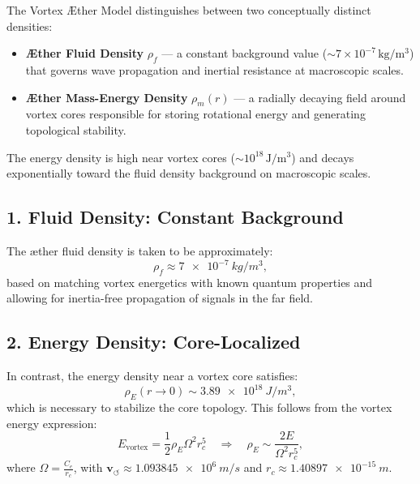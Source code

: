 The Vortex Æther Model distinguishes between two conceptually distinct densities:

\begin{itemize}
    \item \textbf{Æther Fluid Density} \(\rho_{\scriptscriptstyle\boldsymbol\!f}\) — a constant background value (\(\sim 7 \times 10^{-7}\, \mathrm{kg/m^3}\)) that governs wave propagation and inertial resistance at macroscopic scales.
    \item \textbf{Æther Mass-Energy Density} \(\rho_{\scriptscriptstyle\boldsymbol\!m}(r)\) — a radially decaying field around vortex cores responsible for storing rotational energy and generating topological stability.
\end{itemize}

The energy density is high near vortex cores (\(\sim 10^{18}\, \mathrm{J/m^3}\)) and decays exponentially toward the fluid density background on
macroscopic scales.


\subsection*{1. Fluid Density: Constant Background}

The æther fluid density is taken to be approximately:
\begin{equation}
    \rho_{\scriptscriptstyle\boldsymbol\!f} \approx \SI{7e-7}{kg/m^3},
\end{equation}
based on matching vortex energetics with known quantum properties and allowing for inertia-free propagation of signals in the far field.

\subsection*{2. Energy Density: Core-Localized}

In contrast, the energy density near a vortex core satisfies:
\begin{equation}
    \rho_{\scriptscriptstyle\boldsymbol\!E}(r \to 0) \sim \SI{3.89e18}{J/m^3},
\end{equation}
which is necessary to stabilize the core topology. This follows from the vortex energy expression:
\begin{equation}
    E_{\text{vortex}} = \frac{1}{2} \rho_{\scriptscriptstyle\boldsymbol\!E} \Omega^2 r_c^5
    \quad\Rightarrow\quad
    \rho_{\scriptscriptstyle\boldsymbol\!E} \sim \frac{2E}{\Omega^2 r_c^5},
\end{equation}
where \( \Omega = \frac{C_e}{r_c} \), with \( \mathbf{v}_{\scriptscriptstyle\boldsymbol{\circlearrowleft}} \approx \SI{1.093845e6}{m/s} \) and \( r_c \approx \SI{1.40897e-15}{m} \).

